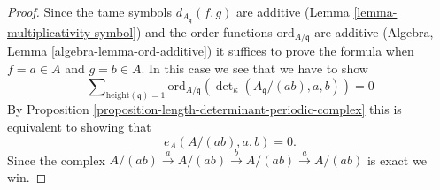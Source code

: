 \documentclass[10pt,a4paper]{amsart}
\theoremstyle{plain}
\theoremstyle{definition}
\theoremstyle{remark}
\numberwithin{equation}{subsection}
\begin{document}
\begin{proof}
Since the tame symbols $d_{A_{\mathfrak q}}(f, g)$ are additive
(Lemma \ref{lemma-multiplicativity-symbol}) and the order
functions $\text{ord}_{A/\mathfrak q}$
are additive (Algebra, Lemma \ref{algebra-lemma-ord-additive})
it suffices to prove the formula when $f = a \in A$ and
$g = b \in A$. In this case we see that we have to show
$$
\sum\nolimits_{\text{height}(\mathfrak q) = 1}
\text{ord}_{A/\mathfrak q}(\det\nolimits_\kappa(A_{\mathfrak q}/(ab), a, b))
= 0
$$
By Proposition \ref{proposition-length-determinant-periodic-complex}
this is equivalent to showing that
$$
e_A(A/(ab), a, b) = 0.
$$
Since the complex
$A/(ab) \xrightarrow{a} A/(ab) \xrightarrow{b} A/(ab) \xrightarrow{a} A/(ab)$
is exact we win.
\end{proof}
\end{document}
